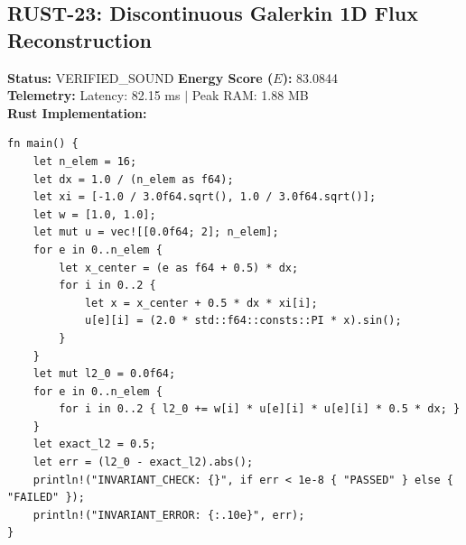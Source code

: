 \documentclass[11pt, a4paper]{article}
\begin{document}
\subsection{RUST-23: Discontinuous Galerkin 1D Flux Reconstruction}
\textbf{Status:} VERIFIED\_SOUND \hfill \textbf{Energy Score ($E$):} 83.0844\\
\textbf{Telemetry:} Latency: 82.15 ms $|$ Peak RAM: 1.88 MB\\
\textbf{Rust Implementation:}
\begin{verbatim}
fn main() {
    let n_elem = 16;
    let dx = 1.0 / (n_elem as f64);
    let xi = [-1.0 / 3.0f64.sqrt(), 1.0 / 3.0f64.sqrt()];
    let w = [1.0, 1.0];
    let mut u = vec![[0.0f64; 2]; n_elem];
    for e in 0..n_elem {
        let x_center = (e as f64 + 0.5) * dx;
        for i in 0..2 {
            let x = x_center + 0.5 * dx * xi[i];
            u[e][i] = (2.0 * std::f64::consts::PI * x).sin();
        }
    }
    let mut l2_0 = 0.0f64;
    for e in 0..n_elem {
        for i in 0..2 { l2_0 += w[i] * u[e][i] * u[e][i] * 0.5 * dx; }
    }
    let exact_l2 = 0.5;
    let err = (l2_0 - exact_l2).abs();
    println!("INVARIANT_CHECK: {}", if err < 1e-8 { "PASSED" } else { "FAILED" });
    println!("INVARIANT_ERROR: {:.10e}", err);
}
\end{verbatim}
\end{document}
